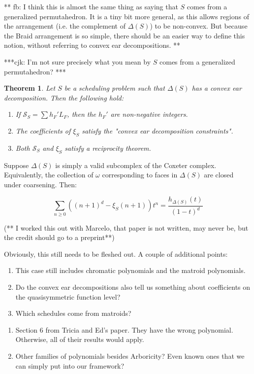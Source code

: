 \documentclass[12pt]{amsart}
\newtheorem{theorem}[definition]{Theorem}
\newcommand{\SSS}{\mathcal{S}}
\begin{document}
** fb: I think this is almost the same thing as saying that $S$ comes from a generalized permutahedron. It is a tiny bit more general, as this allows regions of the arrangement (i.e. the complement of $\Delta(S)$) to be non-convex. But because the Braid arrangement is so simple, there should be an easier way to define this notion, without referring to convex ear decompositions. **

***cjk: I'm not sure precisely what you mean by $S$ comes from a generalized permutahedron? ***



\begin{theorem}
Let $S$ be a scheduling problem such that $\Delta(S)$ has a convex ear decomposition. Then the following hold:
\begin{enumerate}
\item If $\SSS_S = \sum h_F' L_F$, then the $h_F'$ are non-negative integers.
\item The coefficients of $\xi_S$ satisfy the "convex ear decomposition constraints".
\item Both $\SSS_S$ and $\xi_S$ satisfy a reciprocity theorem.
\end{enumerate}
\end{theorem}


Suppose $\Delta(S)$ is simply a valid subcomplex of the Coxeter complex.  Equivalently, the collection of $\omega$ 
corresponding to faces in $\Delta(S)$ are closed under coarsening.  Then:

$$ \sum_{n \geq 0} ((n+1)^d - \xi_S(n+1)) t^n = \frac{h_{\Delta(S)}(t)}{(1-t)^d} $$

(** I worked this out with Marcelo, that paper is not written, may never be, but the credit should go to a preprint**) 

Obviously, this still needs to be fleshed out. A couple of additional points:
\begin{enumerate} 
\item This case still includes chromatic polynomials and the matroid polynomials.
\item Do the convex ear decompositions also tell us something about coefficients on the quasisymmetric function level?
\item Which schedules come from matroids? 
\end{enumerate}


\begin{enumerate}
\item Section 6 from Tricia and Ed's paper.  They have the wrong polynomial.  Otherwise, all of their results would apply.
\item Other families of polynomials besides Arboricity?  Even known ones that we can simply put into our framework?
\end{enumerate}
\end{document}
